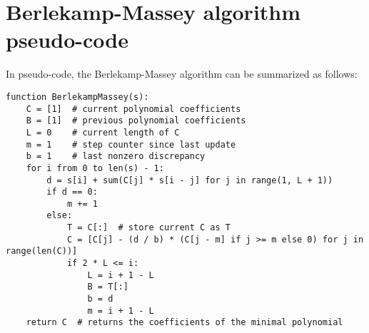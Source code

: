 \documentclass[a4paper, 11pt]{article}
\begin{document}
\section{Berlekamp-Massey algorithm pseudo-code}
In pseudo-code, the Berlekamp-Massey algorithm can be summarized as follows:
\begin{verbatim}
function BerlekampMassey(s):
    C = [1]  # current polynomial coefficients
    B = [1]  # previous polynomial coefficients
    L = 0    # current length of C
    m = 1    # step counter since last update
    b = 1    # last nonzero discrepancy
    for i from 0 to len(s) - 1:
        d = s[i] + sum(C[j] * s[i - j] for j in range(1, L + 1))
        if d == 0:
            m += 1
        else:
            T = C[:]  # store current C as T
            C = [C[j] - (d / b) * (C[j - m] if j >= m else 0) for j in range(len(C))]
            if 2 * L <= i:
                L = i + 1 - L
                B = T[:]
                b = d
                m = i + 1 - L
    return C  # returns the coefficients of the minimal polynomial
\end{verbatim}

\pagebreak



\end{document}
